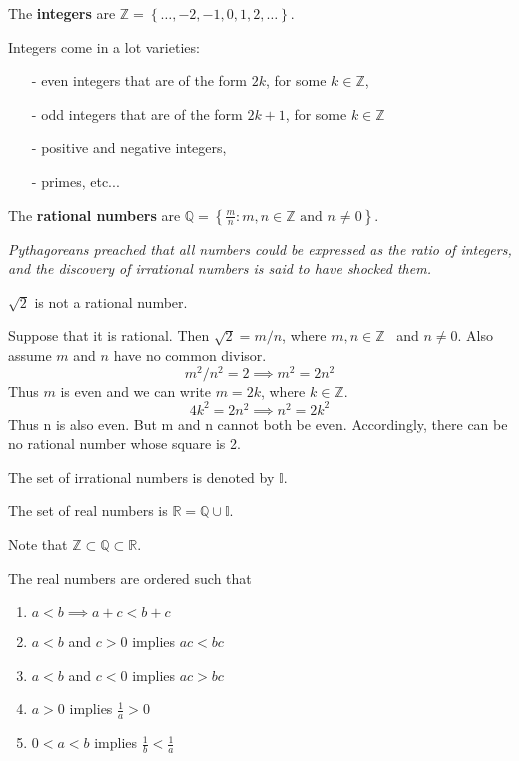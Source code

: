 \documentclass[../main.tex]{subfiles}
\begin{document}
The \textbf{integers} are $\mathbb{Z}= \left\{ \dots, -2, -1, 0,1, 2, \dots \right\}$.

Integers come in a lot varieties:
\begin{itemize}
  \item[-] even integers that are of the form $2k$, for some $k\in \mathbb{Z}$,
  \item[-] odd integers that are of the form $2k+1$, for some $k\in \mathbb{Z}$
  \item[-] positive and negative integers,
  \item[-] primes, etc...
\end{itemize}

The \textbf{rational numbers} are $\mathbb{Q=}\left\{ \frac{m}{n}:m,n\in \mathbb{Z}\text{ and }n\neq 0\right\}$.

\textit{Pythagoreans preached that all numbers could be expressed as the ratio of integers, and the discovery of irrational numbers is said to have shocked them.}

\begin{example}
$\sqrt{2}$ is not a rational number.

Suppose that it is rational. Then $\sqrt{2}=m/n$, where $m,n\in \mathbb{Z}$ \ and $n\neq 0$. Also assume $m$ and $n$ have no common divisor.
\[
  m^{2}/n^{2}=2  \implies m^{2}=2n^{2}
\]
Thus $m$ is even and we can write $m=2k$, where $k\in \mathbb{Z}$.
\[
  4k^{2}=2n^{2} \implies n^{2}=2k^{2}
\]
Thus n is also even. But m and n cannot both be even. Accordingly, there can be no rational number whose square is 2.
\end{example}

The set of irrational numbers is denoted by $\mathbb{I}$.

The set of real numbers is $\mathbb{R} = \mathbb{Q} \cup \mathbb{I}$.

Note that $\mathbb{Z} \subset \mathbb{Q} \subset \mathbb{R}$.

The real numbers are ordered such that
\begin{enumerate}
\item $a<b \implies a+c<b+c$

\item $a<b$ and $c>0$ implies $ac<bc$

\item $a<b$ and $c<0$ implies $ac>bc$

\item $a>0$ implies $\frac{1}{a}>0$

\item $0<a<b$ implies $\frac{1}{b}<\frac{1}{a}$
\end{enumerate}
\end{document}
